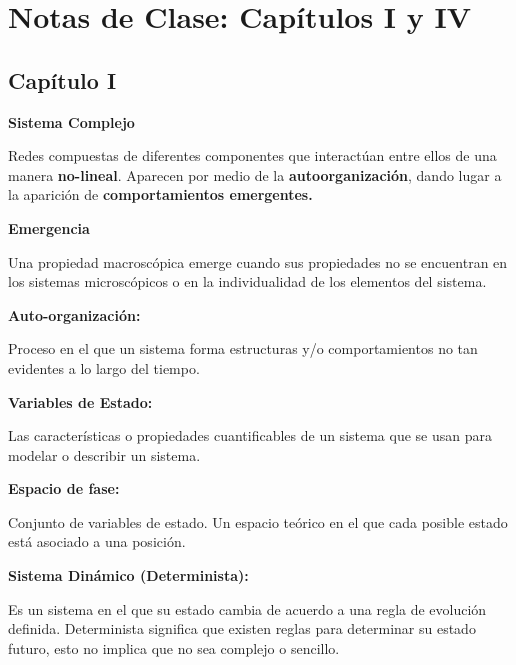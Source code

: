 \documentclass[12pt]{article}
\begin{document}
\tableofcontents


\section{Notas de Clase: Capítulos I y IV}

\subsection{Capítulo I}

\begin{tcolorbox}
  \textbf{\LARGE Sistema Complejo}

  Redes compuestas de diferentes componentes que interactúan entre ellos de una manera \textbf{no-lineal}. Aparecen por medio de la \textbf{autoorganización}, dando lugar a la aparición de \textbf{comportamientos emergentes.}
\end{tcolorbox}

\begin{tcolorbox}
  \textbf{\LARGE Emergencia}

  Una propiedad macroscópica emerge cuando sus propiedades no se encuentran en los sistemas microscópicos o en la individualidad de los elementos del sistema.
\end{tcolorbox}

\begin{tcolorbox}

  \textbf{\LARGE Auto-organización:}

  Proceso en el que un sistema forma estructuras y/o comportamientos no tan evidentes a lo largo del tiempo.
\end{tcolorbox}

\begin{tcolorbox}

  \textbf{\LARGE Variables de Estado:}

  Las características o propiedades cuantificables de un sistema que se usan para modelar o describir un sistema.
\end{tcolorbox}

\begin{tcolorbox}
  \textbf{\LARGE Espacio de fase:}

  Conjunto de variables de estado. Un espacio teórico en el que cada posible estado está asociado a una posición.
\end{tcolorbox}

\begin{tcolorbox}
  \textbf{\LARGE Sistema Dinámico (Determinista):}

  Es un sistema en el que su estado cambia de acuerdo a una regla de evolución definida. Determinista significa que existen reglas para determinar su estado futuro, esto no implica que no sea complejo o sencillo.
\end{tcolorbox}
\end{document}
